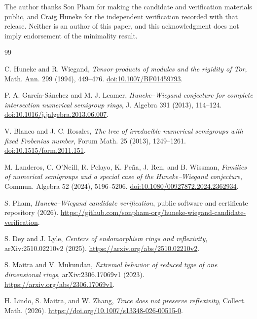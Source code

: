 \documentclass[11pt]{article}
\theoremstyle{definition}
\theoremstyle{remark}
\begin{document}
The author thanks Son Pham for making the candidate and verification materials public, and Craig
Huneke for the independent verification recorded with that release. Neither is an author of this
paper, and this acknowledgment does not imply endorsement of the minimality result.

{\footnotesize
\begin{thebibliography}{99}
\setlength{\itemsep}{0.25em}
\setlength{\parsep}{0pt}

C. Huneke and R. Wiegand,
\emph{Tensor products of modules and the rigidity of Tor},
Math. Ann. 299 (1994), 449--476.
\href{https://doi.org/10.1007/BF01459793}{doi:10.1007/BF01459793}.

P. A. Garc\'ia-S\'anchez and M. J. Leamer,
\emph{Huneke--Wiegand conjecture for complete intersection numerical semigroup rings},
J. Algebra 391 (2013), 114--124.
\href{https://doi.org/10.1016/j.jalgebra.2013.06.007}{doi:10.1016/j.jalgebra.2013.06.007}.

V. Blanco and J. C. Rosales,
\emph{The tree of irreducible numerical semigroups with fixed Frobenius number},
Forum Math. 25 (2013), 1249--1261.
\href{https://doi.org/10.1515/form.2011.151}{doi:10.1515/form.2011.151}.

M. Landeros, C. O'Neill, R. Pelayo, K. Pe\~na, J. Ren, and B. Wissman,
\emph{Families of numerical semigroups and a special case of the Huneke--Wiegand conjecture},
Commun. Algebra 52 (2024), 5196--5206.
\href{https://doi.org/10.1080/00927872.2024.2362934}{doi:10.1080/00927872.2024.2362934}.

S. Pham,
\emph{Huneke--Wiegand candidate verification}, public software and certificate repository (2026).
\url{https://github.com/sonpham-org/huneke-wiegand-candidate-verification}.

S. Dey and J. Lyle,
\emph{Centers of endomorphism rings and reflexivity},
arXiv:2510.02210v2 (2025).
\url{https://arxiv.org/abs/2510.02210v2}.

S. Maitra and V. Mukundan,
\emph{Extremal behavior of reduced type of one dimensional rings},
arXiv:2306.17069v1 (2023).
\url{https://arxiv.org/abs/2306.17069v1}.

H. Lindo, S. Maitra, and W. Zhang,
\emph{Trace does not preserve reflexivity},
Collect. Math. (2026).
\url{https://doi.org/10.1007/s13348-026-00515-0}.


\end{thebibliography}}
\end{document}
